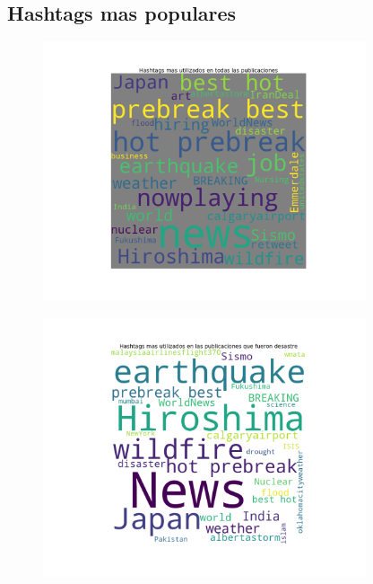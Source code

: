 \documentclass[titlepage,a4paper]{article}
\begin{document}
\subsection{\Large Hashtags mas populares}
{\Large
\begin{figure}[H]
 \centering
 \includegraphics[width=0.85\textwidth, height=0.8\textheight, keepaspectratio]{graficos/analisis_hashtags_0.png}
\end{figure}
\begin{figure}[H]
 \centering
 \includegraphics[width=0.85\textwidth, height=0.85\textheight, keepaspectratio]{graficos/analisis_hashtags_1.png}
\end{figure}
\begin{figure}[H]
 \centering

\end{figure}}
\end{document}
